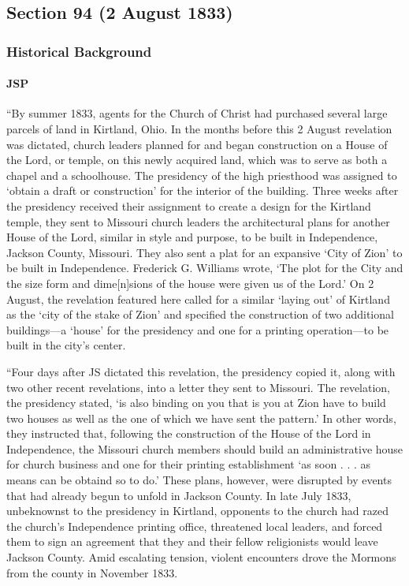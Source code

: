 \subsection{Section 94 (2 August 1833)}
	\label{DC94}
	
	\subsubsection{Historical Background}
		\label{DC94-HB}
		
		\paragraph{JSP}
		
			``By summer 1833, agents for the Church of Christ had purchased several large parcels of land in Kirtland, Ohio. In the months before this 2 August revelation was dictated, church leaders planned for and began construction on a House of the Lord, or temple, on this newly acquired land, which was to serve as both a chapel and a schoolhouse. The presidency of the high priesthood was assigned to `obtain a draft or construction' for the interior of the building. Three weeks after the presidency received their assignment to create a design for the Kirtland temple, they sent to Missouri church leaders the architectural plans for another House of the Lord, similar in style and purpose, to be built in Independence, Jackson County, Missouri. They also sent a plat for an expansive `City of Zion' to be built in Independence. Frederick G. Williams wrote, `The plot for the City and the size form and dime[n]sions of the house were given us of the Lord.' On 2 August, the revelation featured here called for a similar `laying out' of Kirtland as the `city of the stake of Zion' and specified the construction of two additional buildings---a `house' for the presidency and one for a printing operation---to be built in the city's center.
			
			``Four days after JS dictated this revelation, the presidency copied it, along with two other recent revelations, into a letter they sent to Missouri. The revelation, the presidency stated, `is also binding on you that is you at Zion have to build two houses as well as the one of which we have sent the pattern.' In other words, they instructed that, following the construction of the House of the Lord in Independence, the Missouri church members should build an administrative house for church business and one for their printing establishment `as soon . . . as means can be obtaind so to do.' These plans, however, were disrupted by events that had already begun to unfold in Jackson County. In late July 1833, unbeknownst to the presidency in Kirtland, opponents to the church had razed the church's Independence printing office, threatened local leaders, and forced them to sign an agreement that they and their fellow religionists would leave Jackson County. Amid escalating tension, violent encounters drove the Mormons from the county in November 1833.
			
